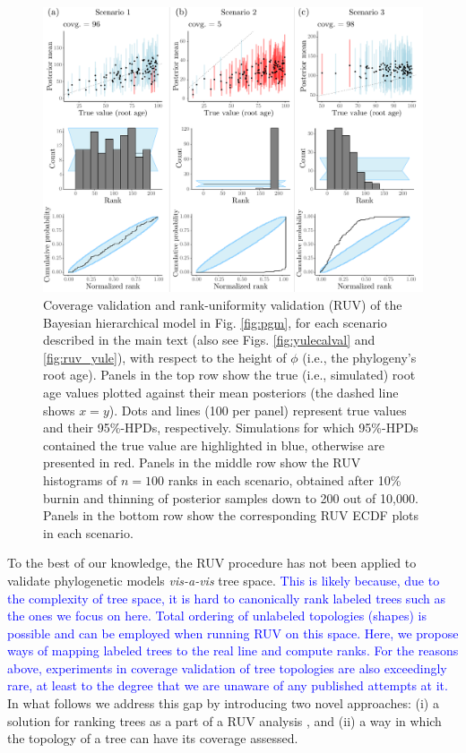 \documentclass[oneside]{article}
\begin{document}
\begin{figure}
  \centering
  \includegraphics[width=0.95\linewidth]{../figures/treeHeight_manual.pdf}
  \caption{
    Coverage validation and rank-uniformity validation (RUV) of the Bayesian hierarchical model in Fig. \ref{fig:pgm}, for each scenario described in the main text (also see Figs. \ref{fig:yulecalval} and \ref{fig:ruv_yule}), with respect to the height of $\phi$ (i.e., the phylogeny's root age).
    Panels in the top row show the true (i.e., simulated) root age values plotted against their mean posteriors (the dashed line shows $x = y$).
    Dots and lines (100 per panel) represent true values and their 95\%-HPDs, respectively.
    Simulations for which 95\%-HPDs contained the true value are highlighted in blue, otherwise are presented in red.
    Panels in the middle row show the RUV histograms of $n=100$ ranks in each scenario, obtained after 10\% burnin and thinning of posterior samples down to 200 out of 10,000.
    Panels in the bottom row show the corresponding RUV ECDF plots in each scenario.
  }
  \label{fig:treeheight}
\end{figure}

To the best of our knowledge, the RUV procedure has not been applied to validate phylogenetic models \textit{vis-a-vis} tree space.
\textcolor{blue}{
This is likely because, due to the complexity of tree space, it is hard to canonically rank labeled trees such as the ones we focus on here.
Total ordering of unlabeled topologies (shapes) is possible \citep{Colijn2018,Maranca2024} and can be employed when running RUV on this space.
Here, we propose ways of mapping labeled trees to the real line and compute ranks.
For the reasons above, experiments in coverage validation of tree topologies are also exceedingly rare, at least to the degree that we are unaware of any published attempts at it.}
In what follows we address this gap by introducing two novel approaches: (i) a solution for ranking trees as a part of a  RUV analysis , and (ii) a way in which the topology of a tree can have its coverage assessed.
\end{document}
